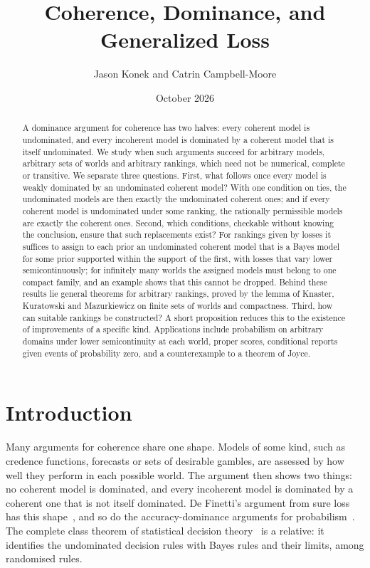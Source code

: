 \documentclass[11pt]{article}
\title{Coherence, Dominance, and Generalized Loss}
\author{Jason Konek and Catrin Campbell-Moore}
\date{October 2026}
\theoremstyle{definition}
\theoremstyle{remark}
\begin{document}
\maketitle

\begin{abstract}
A dominance argument for coherence has two halves: every coherent model is undominated, and every incoherent model is dominated by a coherent model that is itself undominated. We study when such arguments succeed for arbitrary models, arbitrary sets of worlds and arbitrary rankings, which need not be numerical, complete or transitive. We separate three questions. First, what follows once every model is weakly dominated by an undominated coherent model? With one condition on ties, the undominated models are then exactly the undominated coherent ones; and if every coherent model is undominated under some ranking, the rationally permissible models are exactly the coherent ones. Second, which conditions, checkable without knowing the conclusion, ensure that such replacements exist? For rankings given by losses it suffices to assign to each prior an undominated coherent model that is a Bayes model for some prior supported within the support of the first, with losses that vary lower semicontinuously; for infinitely many worlds the assigned models must belong to one compact family, and an example shows that this cannot be dropped. Behind these results lie general theorems for arbitrary rankings, proved by the lemma of Knaster, Kuratowski and Mazurkiewicz on finite sets of worlds and compactness. Third, how can suitable rankings be constructed? A short proposition reduces this to the existence of improvements of a specific kind. Applications include probabilism on arbitrary domains under lower semicontinuity at each world, proper scores, conditional reports given events of probability zero, and a counterexample to a theorem of Joyce.
\end{abstract}

\section{Introduction}\label{sec:intro}

Many arguments for coherence share one shape. Models of some kind, such as credence functions, forecasts or sets of desirable gambles, are assessed by how well they perform in each possible world. The argument then shows two things: no coherent model is dominated, and every incoherent model is dominated by a coherent one that is not itself dominated. De Finetti's argument from sure loss has this shape~\cite{deFinetti}, and so do the accuracy-dominance arguments for probabilism~\cite{Joyce,Predd,SSK09,Pettigrew,Nielsen}. The complete class theorem of statistical decision theory~\cite{Wald} is a relative: it identifies the undominated decision rules with Bayes rules and their limits, among randomised rules.
\end{document}

